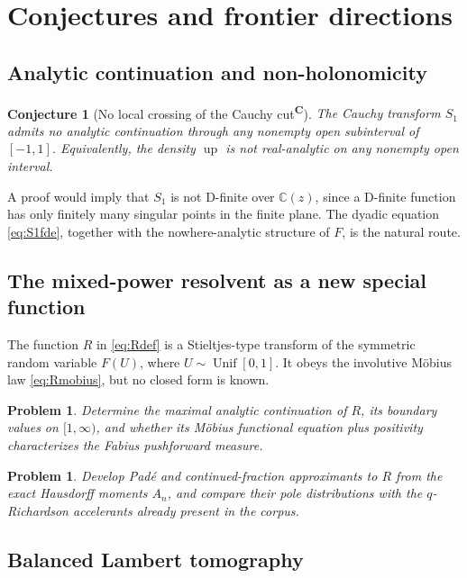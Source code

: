 \documentclass[11pt,oneside]{article}
\newtheorem{conjecture}[theorem]{Conjecture}
\newtheorem{problem}[theorem]{Problem}
\theoremstyle{definition}
\theoremstyle{remark}
\newcommand{\F}{F}
\newcommand{\Up}{\operatorname{up}}
\newcommand{\C}{\mathbb C}
\newcommand{\tagconj}{\textsuperscript{\textcolor{oliveink}{\bfseries C}}}
\begin{document}
\section{Conjectures and frontier directions}

\subsection{Analytic continuation and non-holonomicity}

\begin{conjecture}[No local crossing of the Cauchy cut\tagconj]
The Cauchy transform \(S_1\) admits no analytic continuation through any
nonempty open subinterval of \([-1,1]\).  Equivalently, the density \(\Up\) is
not real-analytic on any nonempty open interval.
\end{conjecture}

A proof would imply that \(S_1\) is not D-finite over \(\C(z)\), since a
D-finite function has only finitely many singular points in the finite plane.
The dyadic equation \eqref{eq:S1fde}, together with the nowhere-analytic
structure of \(\F\), is the natural route.

\subsection{The mixed-power resolvent as a new special function}

The function \(R\) in \eqref{eq:Rdef} is a Stieltjes-type transform of the
symmetric random variable \(\F(U)\), where \(U\sim\operatorname{Unif}[0,1]\).
It obeys the involutive Möbius law \eqref{eq:Rmobius}, but no closed form is
known.

\begin{problem}
Determine the maximal analytic continuation of \(R\), its boundary values on
\([1,\infty)\), and whether its Möbius functional equation plus positivity
characterizes the Fabius pushforward measure.
\end{problem}

\begin{problem}
Develop Pad\'e and continued-fraction approximants to \(R\) from the exact
Hausdorff moments \(A_n\), and compare their pole distributions with the
\(q\)-Richardson accelerants already present in the corpus.
\end{problem}

\subsection{Balanced Lambert tomography}
\end{document}
